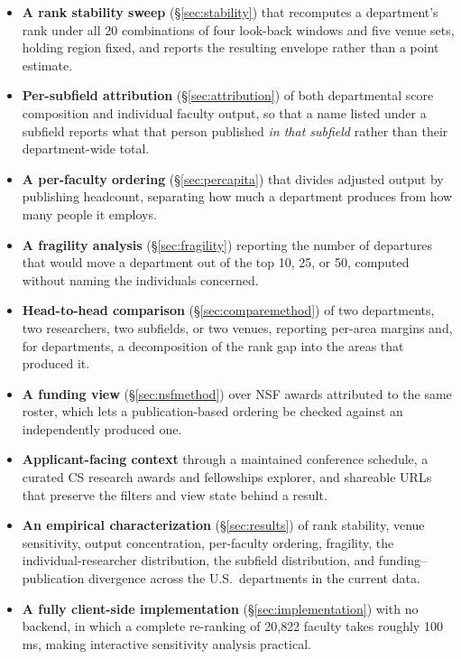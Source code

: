 \documentclass[11pt]{article}
\begin{document}
\begin{itemize}
  \item \textbf{A rank stability sweep} (\S\ref{sec:stability}) that recomputes
    a department's rank under all 20 combinations of four look-back windows and
    five venue sets, holding region fixed, and reports the resulting envelope
    rather than a point estimate.
  \item \textbf{Per-subfield attribution} (\S\ref{sec:attribution}) of both
    departmental score composition and individual faculty output, so that a
    name listed under a subfield reports what that person published
    \emph{in that subfield} rather than their department-wide total.
  \item \textbf{A per-faculty ordering} (\S\ref{sec:percapita}) that divides
    adjusted output by publishing headcount, separating how much a department
    produces from how many people it employs.
  \item \textbf{A fragility analysis} (\S\ref{sec:fragility}) reporting the
    number of departures that would move a department out of the top 10, 25, or
    50, computed without naming the individuals concerned.
  \item \textbf{Head-to-head comparison} (\S\ref{sec:comparemethod}) of two
    departments, two researchers, two subfields, or two venues, reporting
    per-area margins and, for departments, a decomposition of the rank gap
    into the areas that produced it.
  \item \textbf{A funding view} (\S\ref{sec:nsfmethod}) over NSF awards
    attributed to the same roster, which lets a publication-based ordering be
    checked against an independently produced one.
  \item \textbf{Applicant-facing context} through a maintained conference
    schedule, a curated CS research awards and fellowships explorer, and
    shareable URLs that preserve the filters and view state behind a result.
  \item \textbf{An empirical characterization} (\S\ref{sec:results}) of rank
    stability, venue sensitivity, output concentration, per-faculty ordering,
    fragility, the individual-researcher distribution, the subfield
    distribution, and funding--publication divergence across the U.S.\
    departments in the current data.
  \item \textbf{A fully client-side implementation} (\S\ref{sec:implementation})
    with no backend, in which a complete re-ranking of 20{,}822 faculty takes
    roughly 100\,ms, making interactive sensitivity analysis practical.
\end{itemize}
\end{document}
